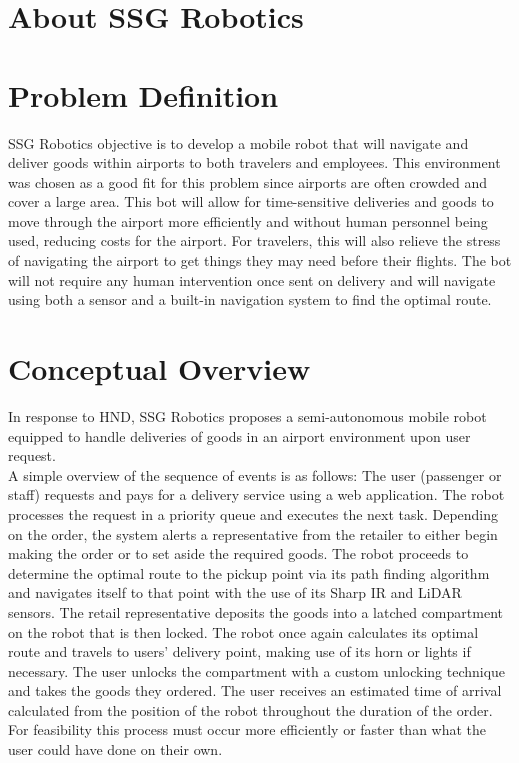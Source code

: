 \documentclass[letterpaper,fleqn,oneside]{template}
\begin{document}
\section{About SSG Robotics}



\section{Problem Definition}
SSG Robotics objective is to develop a mobile robot that will navigate and deliver goods within airports to both travelers and employees. This environment was chosen as a good fit for this problem since airports are often crowded and cover a large area. This bot will allow for time-sensitive deliveries and goods to move through the airport more efficiently and without human personnel being used, reducing costs for the airport. For travelers, this will also relieve the stress of navigating the airport to get things they may need before their flights. The bot will not require any human intervention once sent on delivery and will navigate using both a sensor and a built-in navigation system to find the optimal route. 

\section{Conceptual Overview}

In response to HND, SSG Robotics proposes a semi-autonomous mobile robot equipped to handle deliveries of goods in an airport environment upon user request.\\

A simple overview of the sequence of events is as follows: The user (passenger or staff) requests and pays for a delivery service using a web application. The robot processes the request in a priority queue and executes the next task. Depending on the order, the system alerts a representative from the retailer to either begin making the order or to set aside the required goods. The robot proceeds to determine the optimal route to the pickup point via its path finding algorithm and navigates itself to that point with the use of its Sharp IR and LiDAR sensors. The retail representative deposits the goods into a latched compartment on the robot that is then locked. The robot once again calculates its optimal route and travels to users’ delivery point, making use of its horn or lights if necessary. The user unlocks the compartment with a custom unlocking technique and takes the goods they ordered. The user receives an estimated time of arrival calculated from the position of the robot throughout the duration of the order. For feasibility this process must occur more efficiently or faster than what the user could have done on their own.
\end{document}
